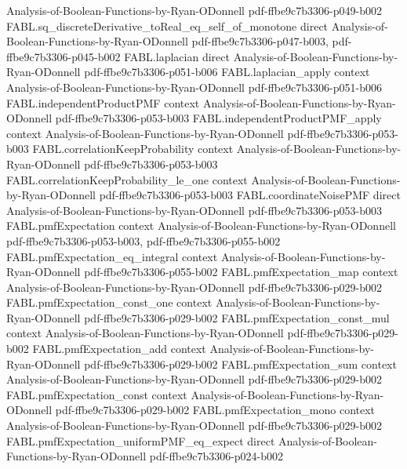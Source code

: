\begin{theorem}
  {Analysis-of-Boolean-Functions-by-Ryan-ODonnell}
  {pdf-ffbe9c7b3306-p049-b002}
\proofstep
  {FABL.sq_discreteDerivative_toReal_eq_self_of_monotone}
  {direct}
  {Analysis-of-Boolean-Functions-by-Ryan-ODonnell}
  {pdf-ffbe9c7b3306-p047-b003,
    pdf-ffbe9c7b3306-p045-b002}
\proofstep
  {FABL.laplacian}
  {direct}
  {Analysis-of-Boolean-Functions-by-Ryan-ODonnell}
  {pdf-ffbe9c7b3306-p051-b006}
\proofstep
  {FABL.laplacian_apply}
  {context}
  {Analysis-of-Boolean-Functions-by-Ryan-ODonnell}
  {pdf-ffbe9c7b3306-p051-b006}
\proofstep
  {FABL.independentProductPMF}
  {context}
  {Analysis-of-Boolean-Functions-by-Ryan-ODonnell}
  {pdf-ffbe9c7b3306-p053-b003}
\proofstep
  {FABL.independentProductPMF_apply}
  {context}
  {Analysis-of-Boolean-Functions-by-Ryan-ODonnell}
  {pdf-ffbe9c7b3306-p053-b003}
\proofstep
  {FABL.correlationKeepProbability}
  {context}
  {Analysis-of-Boolean-Functions-by-Ryan-ODonnell}
  {pdf-ffbe9c7b3306-p053-b003}
\proofstep
  {FABL.correlationKeepProbability_le_one}
  {context}
  {Analysis-of-Boolean-Functions-by-Ryan-ODonnell}
  {pdf-ffbe9c7b3306-p053-b003}
\proofstep
  {FABL.coordinateNoisePMF}
  {direct}
  {Analysis-of-Boolean-Functions-by-Ryan-ODonnell}
  {pdf-ffbe9c7b3306-p053-b003}
\proofstep
  {FABL.pmfExpectation}
  {context}
  {Analysis-of-Boolean-Functions-by-Ryan-ODonnell}
  {pdf-ffbe9c7b3306-p053-b003,
    pdf-ffbe9c7b3306-p055-b002}
\proofstep
  {FABL.pmfExpectation_eq_integral}
  {context}
  {Analysis-of-Boolean-Functions-by-Ryan-ODonnell}
  {pdf-ffbe9c7b3306-p055-b002}
\proofstep
  {FABL.pmfExpectation_map}
  {context}
  {Analysis-of-Boolean-Functions-by-Ryan-ODonnell}
  {pdf-ffbe9c7b3306-p029-b002}
\proofstep
  {FABL.pmfExpectation_const_one}
  {context}
  {Analysis-of-Boolean-Functions-by-Ryan-ODonnell}
  {pdf-ffbe9c7b3306-p029-b002}
\proofstep
  {FABL.pmfExpectation_const_mul}
  {context}
  {Analysis-of-Boolean-Functions-by-Ryan-ODonnell}
  {pdf-ffbe9c7b3306-p029-b002}
\proofstep
  {FABL.pmfExpectation_add}
  {context}
  {Analysis-of-Boolean-Functions-by-Ryan-ODonnell}
  {pdf-ffbe9c7b3306-p029-b002}
\proofstep
  {FABL.pmfExpectation_sum}
  {context}
  {Analysis-of-Boolean-Functions-by-Ryan-ODonnell}
  {pdf-ffbe9c7b3306-p029-b002}
\proofstep
  {FABL.pmfExpectation_const}
  {context}
  {Analysis-of-Boolean-Functions-by-Ryan-ODonnell}
  {pdf-ffbe9c7b3306-p029-b002}
\proofstep
  {FABL.pmfExpectation_mono}
  {context}
  {Analysis-of-Boolean-Functions-by-Ryan-ODonnell}
  {pdf-ffbe9c7b3306-p029-b002}
\proofstep
  {FABL.pmfExpectation_uniformPMF_eq_expect}
  {direct}
  {Analysis-of-Boolean-Functions-by-Ryan-ODonnell}
  {pdf-ffbe9c7b3306-p024-b002}

\end{theorem}
